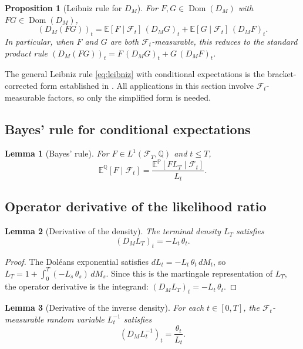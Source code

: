 \documentclass[11pt]{article}
\theoremstyle{plain}
\newtheorem{proposition}{Proposition}[section]
\newtheorem{lemma}{Lemma}[section]
\theoremstyle{definition}
\theoremstyle{remark}
\newcommand{\E}{\mathbb{E}}
\newcommand{\F}{\mathcal{F}}
\newcommand{\PP}{\mathbb{P}}
\newcommand{\QQ}{\mathbb{Q}}
\DeclareMathOperator{\Dom}{Dom}
\begin{document}
\begin{proposition}[Leibniz rule for $D_M$]\label{prop:leibniz}
For $F, G \in \Dom(D_M)$ with $FG \in \Dom(D_M)$,
\begin{equation}\label{eq:leibniz}
(D_M(FG))_t = \E[F \mid \F_t]\,(D_M G)_t + \E[G \mid \F_t]\,(D_M F)_t.
\end{equation}
In particular, when $F$ and $G$ are both $\F_t$-measurable, this reduces to the
standard product rule $(D_M(FG))_t = F\,(D_M G)_t + G\,(D_M F)_t$.
\end{proposition}

The general Leibniz rule \eqref{eq:leibniz} with conditional expectations is
the bracket-corrected form established in \cite{Fontes2026g}. All applications
in this section involve $\F_t$-measurable factors, so only the simplified form
is needed.

\subsection{Bayes' rule for conditional expectations}

\begin{lemma}[Bayes' rule]\label{lem:bayes}
For $F \in L^1(\F_T, \QQ)$ and $t \le T$,
\begin{equation}\label{eq:bayes}
\E^{\QQ}[F \mid \F_t] = \frac{\E^{\PP}[F L_T \mid \F_t]}{L_t}.
\end{equation}
\end{lemma}

\subsection{Operator derivative of the likelihood ratio}

\begin{lemma}[Derivative of the density]\label{lem:DL}
The terminal density $L_T$ satisfies
\begin{equation}\label{eq:DL}
(D_M L_T)_t = -L_t\,\theta_t.
\end{equation}
\end{lemma}

\begin{proof}
The Dol\'eans exponential satisfies $dL_t = -L_t\,\theta_t\,dM_t$, so
$L_T = 1 + \int_0^T (-L_s\,\theta_s)\,dM_s$. Since this is the martingale
representation of $L_T$, the operator derivative is the integrand:
$(D_M L_T)_t = -L_t\,\theta_t$.
\end{proof}

\begin{lemma}[Derivative of the inverse density]\label{lem:DLinv}
For each $t \in [0,T]$, the $\F_t$-measurable random variable $L_t^{-1}$
satisfies
\begin{equation}\label{eq:DLinv}
(D_M L_t^{-1})_t = \frac{\theta_t}{L_t}.
\end{equation}
\end{lemma}
\end{document}
